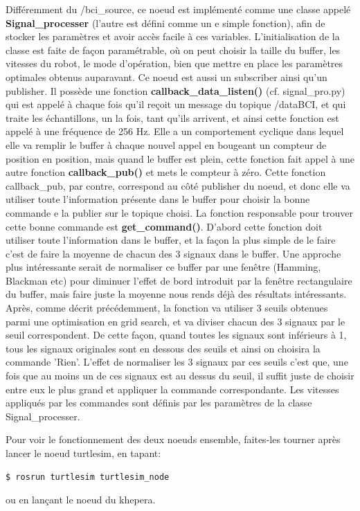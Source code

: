 Différemment du /bci\_source, ce noeud est implémenté comme une classe appelé \textbf{Signal\_processer} (l'autre est défini comme un e simple fonction), afin de stocker les paramètres et avoir accès facile à ces variables. L'initialisation de la classe est faite de façon paramétrable, où on peut choisir la taille du buffer, les vitesses du robot, le mode d'opération, bien que mettre en place les paramètres optimales obtenus auparavant. Ce noeud est aussi un subscriber ainsi qu'un publisher. Il possède une fonction \textbf{callback\_data\_listen()} (cf. signal\_pro.py) qui est appelé à chaque fois qu'il reçoit un message du topique /dataBCI, et qui traite les échantillons, un la fois, tant qu'ils arrivent, et ainsi cette fonction est appelé à une fréquence de 256 Hz. Elle a un comportement cyclique dans lequel elle va remplir le buffer à chaque nouvel appel en bougeant un compteur de position en position, mais quand le buffer est plein, cette fonction fait appel à une autre fonction \textbf{callback\_pub()} et mets le compteur à zéro. Cette fonction callback\_pub, par contre, correspond au côté publisher du noeud, et donc elle va utiliser toute l'information présente dans le buffer pour choisir la bonne commande e la publier sur le topique choisi. La fonction responsable pour trouver cette bonne commande est \textbf{get\_command()}. D'abord cette fonction doit utiliser toute l'information dans le buffer, et la façon la plus simple de le faire c'est de faire la moyenne de chacun des 3 signaux dans le buffer. Une approche plus intéressante serait de normaliser ce buffer par une fenêtre (Hamming, Blackman etc) pour diminuer l'effet de bord introduit par la fenêtre rectangulaire du buffer, mais faire juste la moyenne nous rends déjà des résultats intéressants. Après, comme décrit précédemment, la fonction va utiliser 3 seuils obtenues parmi une optimisation en grid search, et va diviser chacun des 3 signaux par le seuil correspondent. De cette façon, quand toutes les signaux sont inférieurs à 1, tous les signaux originales sont en dessous des seuils et ainsi on choisira la commande 'Rien'. L'effet de normaliser les 3 signaux par ces seuils c'est que, une fois que au moins un de ces signaux est au dessus du seuil, il suffit juste de choisir entre eux le plus grand et appliquer la commande correspondante. Les vitesses appliqués par les commandes sont définis par les paramètres de la classe Signal\_processer.   

Pour voir le fonctionnement des deux noeuds ensemble, faites-les tourner après lancer le noeud turtlesim, en tapant:
\begin{lstlisting}[language=bash]
  $ rosrun turtlesim turtlesim_node
\end{lstlisting}

ou en lançant le noeud du khepera.
